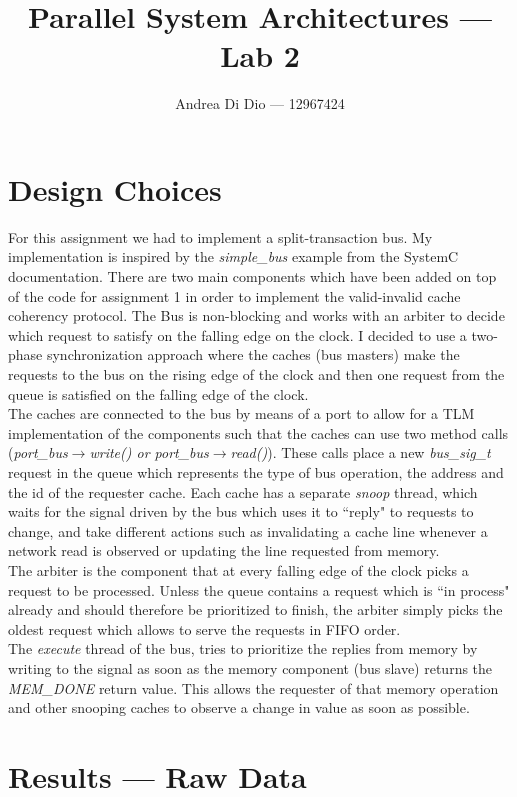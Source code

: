 \documentclass[]{article}
\title{Parallel System Architectures --- Lab 2}
\author{Andrea Di Dio --- 12967424}
\begin{document}
\maketitle

\section{Design Choices}

For this assignment we had to implement a split-transaction bus. My implementation is inspired by the \textit{simple\_bus} example from the SystemC documentation. There are two main components which have been added on top of the code for assignment 1 in order to implement the valid-invalid cache coherency protocol. The Bus is non-blocking and works with an arbiter to decide which request to satisfy on the falling edge on the clock. I decided to use a two-phase synchronization approach where the caches (bus masters) make the requests to the bus on the rising edge of the clock and then one request from the queue is satisfied on the falling edge of the clock. \\
The caches are connected to the bus by means of a port to allow for a TLM implementation of the components such that the caches can use two method calls (\textit{port\_bus$\rightarrow$write() or port\_bus$\rightarrow$read()}). These calls place a new \textit{bus\_sig\_t} request in the queue which represents the type of bus operation, the address and the id of the requester cache. Each cache has a separate \textit{snoop} thread, which waits for the signal driven by the bus which uses it to ``reply" to requests to change, and take different actions such as invalidating a cache line whenever a network read is observed or updating the line requested from memory.\\
The arbiter is the component that at every falling edge of the clock picks a request to be processed. Unless the queue contains a request which is ``in process" already and should therefore be prioritized to finish, the arbiter simply picks the oldest request which allows to serve the requests in FIFO order.\\
The \textit{execute} thread of the bus, tries to prioritize the replies from memory by writing to the signal as soon as the memory component (bus slave) returns the \textit{MEM\_DONE} return value. This allows the requester of that memory operation and other snooping caches to observe a change in value as soon as possible.


\section{Results --- Raw Data}
\end{document}
